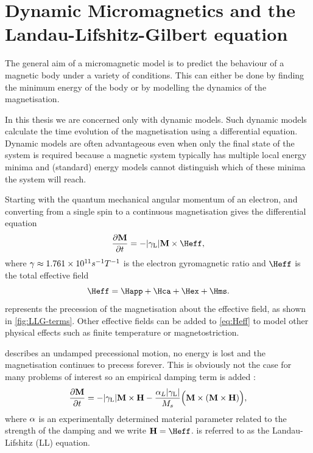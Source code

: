 \section{Dynamic Micromagnetics and the Landau-Lifshitz-Gilbert equation}
\label{sec:land-lifsch-gilb}

The general aim of a micromagnetic model is to predict the behaviour of a magnetic body under a variety of conditions.
This can either be done by finding the minimum energy of the body or by modelling the dynamics of the magnetisation.

In this thesis we are concerned only with dynamic models.
Such dynamic models calculate the time evolution of the magnetisation using a differential equation.
Dynamic models are often advantageous even when only the final state of the system is required because a magnetic system typically has multiple local energy minima and (standard) energy models cannot distinguish which of these minima the system will reach.

Starting with the quantum mechanical angular momentum of an electron, and converting from a single spin to a continuous magnetisation gives the differential equation \cite[306]{Coey2010}
\begin{equation}
  \label{eq:38}
  \dMdt = - \gymagc \Mv \times \Heff,
\end{equation}
where $\gamma \approx 1.761 \times 10^{11} s^{-1} T^{-1}$ is the electron gyromagnetic ratio and $\Heff$ is the total effective field
\begin{equation}
  \Heff = \Happ + \Hca + \Hex + \Hms.
  \label{eq:Heff}
\end{equation}
 represents the precession of the magnetisation about the effective field, as shown in \cref{fig:LLG-terms}. Other effective fields can be added to \cref{eq:Heff} to model other physical effects such as finite temperature or magnetostriction.

 describes an undamped precessional motion, \ie no energy is lost and the magnetisation continues to precess forever. This is obviously not the case for many problems of interest so an empirical damping term is added \cite{Landau1935}:
\begin{equation}
  \label{eq:LL}
  \frac{\partial \boldsymbol{\mathrm{M}}}{\partial t} = - {\left|{\gamma_{\mathrm{\tiny{L}}}} \right|} \boldsymbol{\mathrm{M}} \times \boldsymbol{\mathrm{H}} - \frac{\alpha_L {\left|{\gamma_{\mathrm{\tiny{L}}}} \right|}}{M_s} \Big( \boldsymbol{\mathrm{M}} \times (\boldsymbol{\mathrm{M}} \times \boldsymbol{\mathrm{H}}) \Big),
\end{equation}
where $\alpha$ is an experimentally determined material parameter related to the strength of the damping and we write $\Hv = \Heff$.  is referred to as the Landau-Lifshitz (LL) equation.

